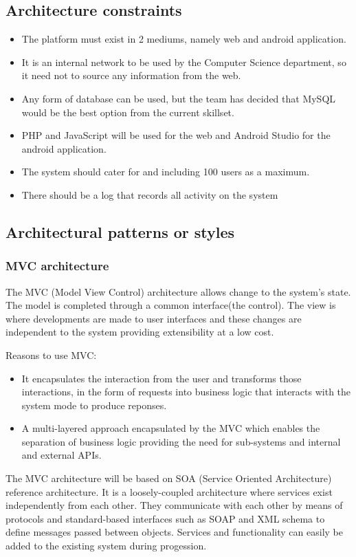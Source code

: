 \documentclass[11pt]{article}
\begin{document}
	\subsection{Architecture constraints}
		\begin{itemize}
			\item The platform must exist in 2 mediums, namely web and android application.
			\item It is an internal network to be used by the Computer Science department, so it need not to source any information from the web.
			\item Any form of database can be used, but the team has decided that MySQL would be the best option from the current skillset.
			\item PHP and JavaScript will be used for the web and Android Studio for the android application.
			\item The system should cater for and including 100 users as a maximum.
			\item There should be a log that records all activity on the system
		\end{itemize}

	
	\subsection{Architectural patterns or styles}
	\subsubsection{MVC architecture}
	The MVC (Model View Control) architecture allows change to the system's state. The model is completed through a common interface(the control). The view is where developments are made to user interfaces and these changes are independent to the system providing extensibility at a low cost.
	
	Reasons to use MVC:	
	\begin{itemize}
		\item It encapsulates the interaction from the user and transforms those interactions, in the form of requests into business logic that interacts with the system mode to produce reponses. 
		\item A multi-layered approach encapsulated by the MVC which enables the separation of business logic providing the need for sub-systems and internal and external APIs.  

	\end{itemize}
	The MVC architecture  will be based on SOA (Service Oriented Architecture) reference architecture. It is a loosely-coupled architecture where services exist independently from each other. They communicate with each other by means of protocols and standard-based interfaces such as SOAP and XML schema to define messages passed between objects. Services and functionality can easily be added to the existing system during progession. 
\end{document}
